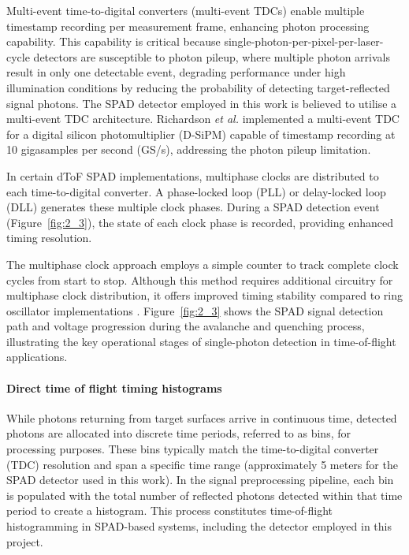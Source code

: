 \documentclass[12pt,a4paper,oneside]{report}
\begin{document}
Multi-event time-to-digital converters (multi-event TDCs) enable multiple timestamp recording per measurement frame, enhancing photon processing capability. This capability is critical because single-photon-per-pixel-per-laser-cycle detectors are susceptible to photon pileup, where multiple photon arrivals result in only one detectable event, degrading performance under high illumination conditions by reducing the probability of detecting target-reflected signal photons. The SPAD detector employed in this work is believed to utilise a multi-event TDC architecture. Richardson \textit{et al.} \cite{richardson2009} implemented a multi-event TDC for a digital silicon photomultiplier (D-SiPM) capable of timestamp recording at 10 gigasamples per second (GS/s), addressing the photon pileup limitation.

In certain dToF SPAD implementations, multiphase clocks are distributed to each time-to-digital converter. A phase-locked loop (PLL) or delay-locked loop (DLL) generates these multiple clock phases. During a SPAD detection event (Figure~\ref{fig:2_3}), the state of each clock phase is recorded, providing enhanced timing resolution.

The multiphase clock approach employs a simple counter to track complete clock cycles from start to stop. Although this method requires additional circuitry for multiphase clock distribution, it offers improved timing stability compared to ring oscillator implementations \cite{alabbas2018}. Figure~\ref{fig:2_3} shows the SPAD signal detection path and voltage progression during the avalanche and quenching process, illustrating the key operational stages of single-photon detection in time-of-flight applications.


\paragraph{Direct time of flight timing histograms}
\label{par:direct_tof_timing_histograms}

While photons returning from target surfaces arrive in continuous time, detected photons are allocated into discrete time periods, referred to as bins, for processing purposes. These bins typically match the time-to-digital converter (TDC) resolution and span a specific time range (approximately 5 meters for the SPAD detector used in this work). In the signal preprocessing pipeline, each bin is populated with the total number of reflected photons detected within that time period to create a histogram. This process constitutes time-of-flight histogramming in SPAD-based systems, including the detector employed in this project.
\end{document}
